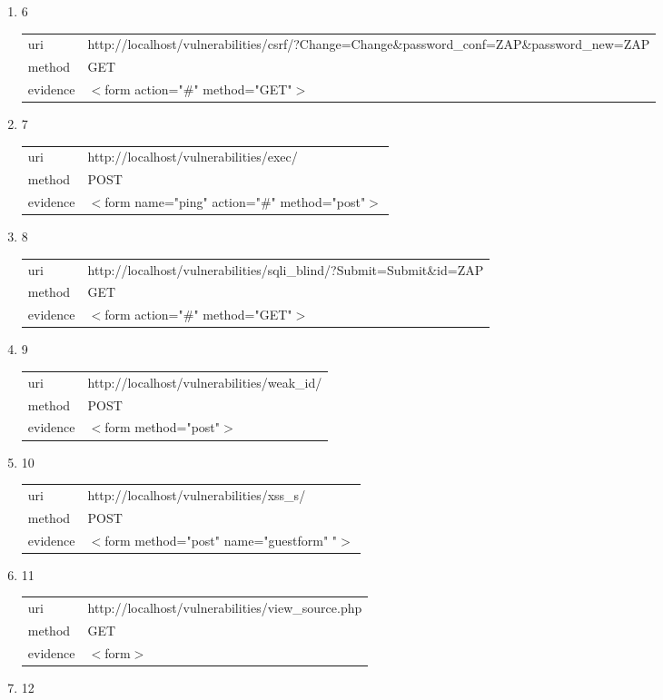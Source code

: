 \documentclass[10pt]{article}
\begin{document}
\begin{itemize}
\begin{enumerate}
\begin{tabular}{| l | p{12cm}}
\end{tabular}
\item[] 6
\begin{tabular}{| l | p{12cm}}
uri & http://localhost/vulnerabilities/csrf/?Change=Change\&password\_conf=ZAP\&password\_new=ZAP \\
method & GET \\
evidence & $<$form action="\#" method="GET"$>$ \\
\end{tabular}
\item[] 7
\begin{tabular}{| l | p{12cm}}
uri & http://localhost/vulnerabilities/exec/ \\
method & POST \\
evidence & $<$form name="ping" action="\#" method="post"$>$ \\
\end{tabular}
\item[] 8
\begin{tabular}{| l | p{12cm}}
uri & http://localhost/vulnerabilities/sqli\_blind/?Submit=Submit\&id=ZAP \\
method & GET \\
evidence & $<$form action="\#" method="GET"$>$ \\
\end{tabular}
\item[] 9
\begin{tabular}{| l | p{12cm}}
uri & http://localhost/vulnerabilities/weak\_id/ \\
method & POST \\
evidence & $<$form method="post"$>$ \\
\end{tabular}
\item[] 10
\begin{tabular}{| l | p{12cm}}
uri & http://localhost/vulnerabilities/xss\_s/ \\
method & POST \\
evidence & $<$form method="post" name="guestform" "$>$ \\
\end{tabular}
\item[] 11
\begin{tabular}{| l | p{12cm}}
uri & http://localhost/vulnerabilities/view\_source.php \\
method & GET \\
evidence & $<$form$>$ \\
\end{tabular}
\item[] 12

\end{enumerate}
\end{itemize}
\end{document}
